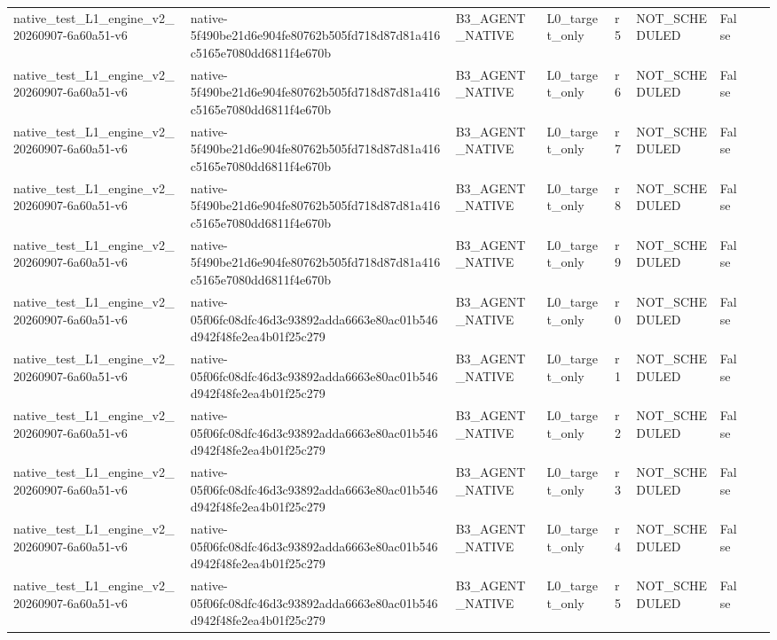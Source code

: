 \begin{tabular}{lllllllll}
native\_test\_L1\_engine\_v2\_20260907-6a60a51-v6 & native-5f490be21d6e904fe80762b505fd718d87d81a416c5165e7080dd6811f4e670b & B3\_AGENT\_NATIVE & L0\_target\_only & r5 & NOT\_SCHEDULED & False &  &  \\
native\_test\_L1\_engine\_v2\_20260907-6a60a51-v6 & native-5f490be21d6e904fe80762b505fd718d87d81a416c5165e7080dd6811f4e670b & B3\_AGENT\_NATIVE & L0\_target\_only & r6 & NOT\_SCHEDULED & False &  &  \\
native\_test\_L1\_engine\_v2\_20260907-6a60a51-v6 & native-5f490be21d6e904fe80762b505fd718d87d81a416c5165e7080dd6811f4e670b & B3\_AGENT\_NATIVE & L0\_target\_only & r7 & NOT\_SCHEDULED & False &  &  \\
native\_test\_L1\_engine\_v2\_20260907-6a60a51-v6 & native-5f490be21d6e904fe80762b505fd718d87d81a416c5165e7080dd6811f4e670b & B3\_AGENT\_NATIVE & L0\_target\_only & r8 & NOT\_SCHEDULED & False &  &  \\
native\_test\_L1\_engine\_v2\_20260907-6a60a51-v6 & native-5f490be21d6e904fe80762b505fd718d87d81a416c5165e7080dd6811f4e670b & B3\_AGENT\_NATIVE & L0\_target\_only & r9 & NOT\_SCHEDULED & False &  &  \\
native\_test\_L1\_engine\_v2\_20260907-6a60a51-v6 & native-05f06fc08dfc46d3c93892adda6663e80ac01b546d942f48fe2ea4b01f25c279 & B3\_AGENT\_NATIVE & L0\_target\_only & r0 & NOT\_SCHEDULED & False &  &  \\
native\_test\_L1\_engine\_v2\_20260907-6a60a51-v6 & native-05f06fc08dfc46d3c93892adda6663e80ac01b546d942f48fe2ea4b01f25c279 & B3\_AGENT\_NATIVE & L0\_target\_only & r1 & NOT\_SCHEDULED & False &  &  \\
native\_test\_L1\_engine\_v2\_20260907-6a60a51-v6 & native-05f06fc08dfc46d3c93892adda6663e80ac01b546d942f48fe2ea4b01f25c279 & B3\_AGENT\_NATIVE & L0\_target\_only & r2 & NOT\_SCHEDULED & False &  &  \\
native\_test\_L1\_engine\_v2\_20260907-6a60a51-v6 & native-05f06fc08dfc46d3c93892adda6663e80ac01b546d942f48fe2ea4b01f25c279 & B3\_AGENT\_NATIVE & L0\_target\_only & r3 & NOT\_SCHEDULED & False &  &  \\
native\_test\_L1\_engine\_v2\_20260907-6a60a51-v6 & native-05f06fc08dfc46d3c93892adda6663e80ac01b546d942f48fe2ea4b01f25c279 & B3\_AGENT\_NATIVE & L0\_target\_only & r4 & NOT\_SCHEDULED & False &  &  \\
native\_test\_L1\_engine\_v2\_20260907-6a60a51-v6 & native-05f06fc08dfc46d3c93892adda6663e80ac01b546d942f48fe2ea4b01f25c279 & B3\_AGENT\_NATIVE & L0\_target\_only & r5 & NOT\_SCHEDULED & False &  &  \\

\end{tabular}
